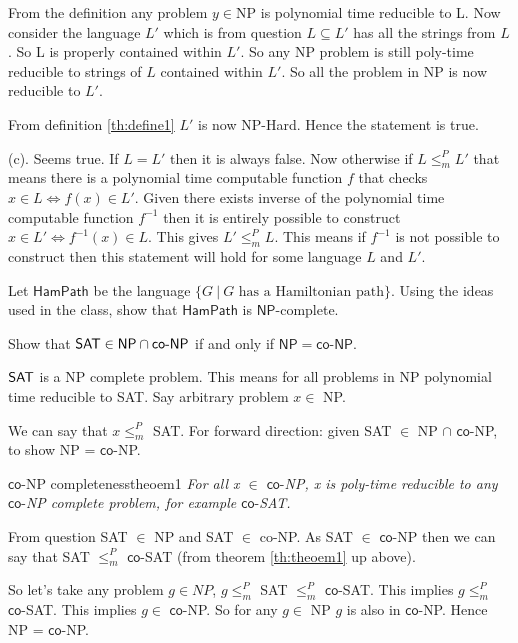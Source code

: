\documentclass[12pt,a4, onecolumn]{exam}
\newcommand{\hamp}{\ensuremath{\mathsf{HamPath}}}
\newcommand{\NP}{\ensuremath{\mathsf{NP}}}
\newcommand{\co}{\ensuremath{\mathsf{co}\mbox{-}}}
\begin{document}
\begin{questions}
\begin{solution}
        From the definition any problem $y \in \text{NP}$ is polynomial time reducible to L. Now consider the language $L'$ which is from question $L \subseteq L'$ has all the strings from $L$. So L is properly contained within $L'$. So any NP problem is still poly-time reducible to strings of $L$ contained within $L'$. So all the problem in NP is now reducible to $L'$.

        From definition \ref{th:define1} $L'$ is now NP-Hard. Hence the statement is true.

        (c). Seems true. If $L = L'$ then it is always false. Now otherwise if $L \le_{m}^P L'$ that means there is a polynomial time computable function $f$ that checks $x \in L \iff f(x) \in L'$. Given there exists inverse of the polynomial time computable function $f^{-1}$ then it is entirely possible to construct $x \in L' \iff f^{-1}(x) \in L$. This gives $L' \le_{m}^P L$. This means if $f^{-1}$ is not possible to construct then this statement will hold for some language $L$ and $L'$.
    \end{solution}
    
    \question Let $\hamp$ be the  language $\{G~|~ G \mbox{ has a Hamiltonian path}\}$.  Using the ideas used in the class, show that $\hamp$ is $\NP$-complete.
    \newpage


    \question Show that  ${\sf SAT}\in \NP\cap\co\NP$ if and only if  $\NP=\co\NP$.

    \begin{solution}
        ${\sf SAT}$ is a NP complete problem. This means for all problems in NP polynomial time reducible to SAT. Say arbitrary problem $x \in$ NP.
    
        We can say that $x \leq_{m} ^P$ SAT. For forward direction: given SAT $\in$ NP $\cap$ $\co$NP, to show NP = $\co$NP.

        \begin{theo}{$\co$NP completeness}{theoem1}
          \textit{For all x $\in$ $\co$NP, x is poly-time reducible to any $\co$NP complete problem, for example $\co$SAT.}
        \end{theo}
        
        From question SAT $\in$ NP and SAT $\in$ co-NP. As SAT $\in$ $\co$NP then we can say that SAT $\leq_{m} ^P$ $\co$SAT (from theorem \ref{th:theoem1} up above).

        So let's take any problem $g \in NP$, $g \leq_{m} ^P$ SAT $\leq_{m} ^P$ $\co$SAT. This implies $g \leq_{m} ^P$ $\co$SAT. This implies $g \in$ $\co$NP. So for any $g \in$ NP $g$ is also in $\co$NP. Hence NP = $\co$NP.


\end{solution}
\end{questions}
\end{document}
